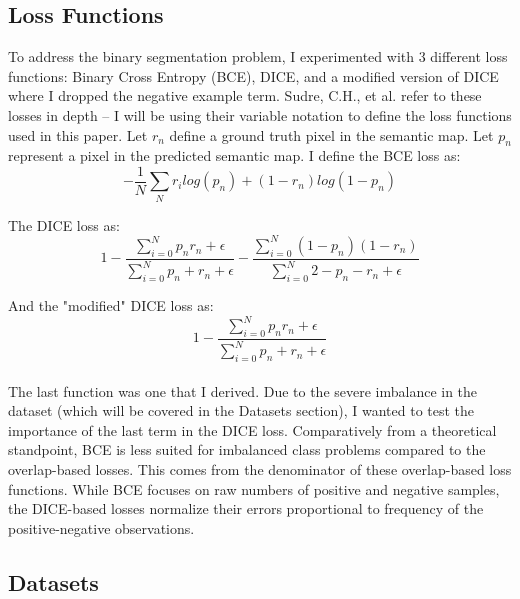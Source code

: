 \documentclass[Location Location Location! : Exploring Image Segmentation Problem In Urban Driving Scenarios]{IEEEtran}
\begin{document}
\subsection{Loss Functions}

To address the binary segmentation problem, I experimented with 3 different loss functions: Binary Cross Entropy (BCE), DICE, and a modified version of DICE where I dropped the negative example term. Sudre, C.H., et al. \cite{gen-dice} refer to these losses in depth -- I will be using their variable notation to define the loss functions used in this paper. Let $r_n$ define a ground truth pixel in the semantic map. Let $p_n$ represent a pixel in the predicted semantic map. I define the BCE loss as: \\


\begin{equation}
-\frac{1}{N} \sum_N r_ilog(p_n) + (1 - r_n)log(1 -p_n)
\end{equation}

The DICE loss as:\\


\begin{equation}
1 -\frac{\sum_{i=0}^N p_nr_n + \epsilon}{\sum_{i=0}^N  p_n + r_n + \epsilon} - \frac{\sum_{i=0}^N  (1 - p_n)(1 - r_n)}{\sum_{i=0}^N  2 - p_n - r_n +\epsilon}
\end{equation}

And the "modified" DICE loss as: \\


\begin{equation}
1 -\frac{\sum_{i=0}^N p_nr_n + \epsilon}{\sum_{i=0}^N  p_n + r_n + \epsilon} 
\end{equation}\\

 
The last function was one that I derived. Due to the severe imbalance in the dataset (which will be covered in the Datasets section), I wanted to test the importance of the last term in the DICE loss. Comparatively from a theoretical standpoint, BCE is less suited for imbalanced class problems compared to the overlap-based losses. This comes from the denominator of these overlap-based loss functions. While BCE focuses on raw numbers of positive and negative samples, the DICE-based losses normalize their errors proportional to frequency of the positive-negative observations.    	

\subsection{Datasets}
\end{document}
